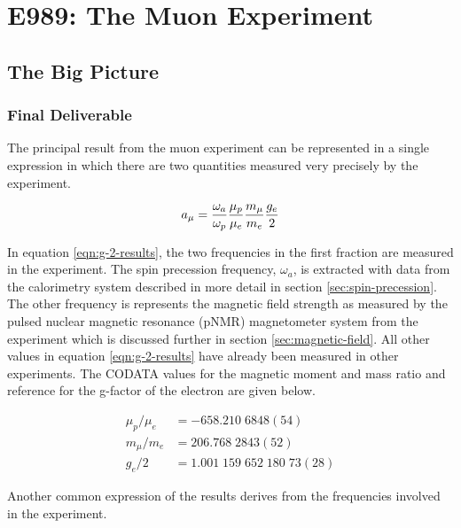 \chapter {E989: The Muon \gmtwo Experiment} \label{ch:expt}

\section{The Big Picture} \label{sec:expt-big-picture}

\subsection{Final Deliverable}

The principal result from the muon \gmtwo experiment can be represented in a single expression in which there are two quantities measured very precisely by the experiment.

\begin{equation}
\label{eqn:g-2-results}
a_\mu = \frac{\omega_a}{\omega_p} \frac{\mu_p}{\mu_e} \\
\frac{m_\mu}{m_e} \frac{g_e}{2}
\end{equation}

\noindent
In equation \ref{eqn:g-2-results}, the two frequencies in the first fraction are measured in the experiment.  The spin precession frequency, $\omega_a$, is extracted with data from the calorimetry system described in more detail in section \ref{sec:spin-precession}.  The other frequency is represents the magnetic field strength as measured by the pulsed nuclear magnetic resonance (pNMR) magnetometer system from the experiment which is discussed further in section \ref{sec:magnetic-field}.  All other values in equation \ref{eqn:g-2-results} have already been measured in other experiments. The CODATA values \cite{codata} for the magnetic moment and mass ratio and reference \cite{g-e-measurement} for the g-factor of the electron are given below.

\begin{align}
\mu_p/\mu_e & = -658.210\;6848(54) \\
m_\mu/m_e & = 206.768\;2843(52) \\
g_e/2 & = 1.001\;159\;652\;180\;73(28)
\end{align}

Another common expression of the \mugmtwo results derives from the frequencies involved in the experiment.

